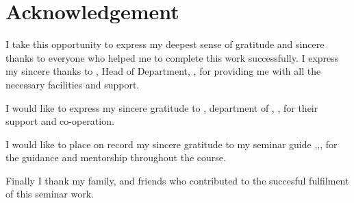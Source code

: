 \chapter*{Acknowledgement}%
%



I take this opportunity to express my deepest sense of gratitude and sincere thanks to everyone who helped me to complete this work successfully. I express my sincere thanks to \textbf{ \hod}, Head of Department, \dept, \college\hspace*{2pt} \collegeplace \hspace*{2pt} for providing  me with all the necessary facilities and support.\par

 I would like to express my sincere gratitude to \textbf{\semcordinatorA}, \hspace*{2pt} department of \hspace*{2pt} \dept, \hspace*{2pt} \college, \hspace*{2pt} \collegeplace \hspace*{2pt} for their support and co-operation.

\noindent I would like to place on record my sincere gratitude to my seminar guide \textbf{\guide},\hspace*{2pt}\guidedes,\hspace*{2pt}\dept,\hspace*{2pt}\college \hspace*{2pt} for the guidance and mentorship throughout the course.

Finally I thank my family, and friends who contributed to the succesful fulfilment of this seminar work.

\vspace*{30pt}
\begin{flushright}
	\textbf{\author}
\end{flushright}
\thispagestyle{plain}
